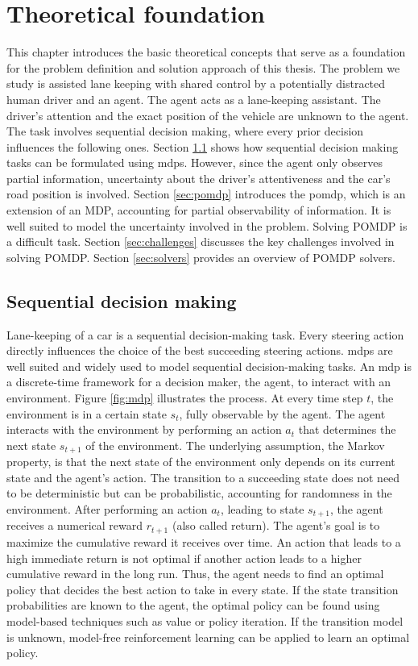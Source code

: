 \chapter{Theoretical foundation}
\label{ch:theory}

This chapter introduces the basic theoretical concepts that serve as a foundation for the problem definition and solution approach of this thesis. The problem we study is assisted lane keeping with shared control by a potentially distracted human driver and an agent. The agent acts as a lane-keeping assistant. The driver's attention and the exact position of the vehicle are unknown to the agent. The task involves sequential decision making, where every prior decision influences the following ones. Section \ref{sec:mdp} shows how sequential decision making tasks can be formulated using \Glspl{mdp}. However, since the agent only observes partial information, uncertainty about the driver's attentiveness and the car's road position is involved. Section \ref{sec:pomdp} introduces the \Gls{pomdp}, which is an extension of an MDP, accounting for partial observability of information. It is well suited to model the uncertainty involved in the problem. Solving POMDP is a difficult task. Section \ref{sec:challenges} discusses the key challenges involved in solving POMDP. Section \ref{sec:solvers} provides an overview of POMDP solvers.

\section{Sequential decision making}
\label{sec:mdp}

Lane-keeping of a car is a sequential decision-making task. Every steering action directly influences the choice of the best succeeding steering actions. \Glspl{mdp} are well suited and widely used to model sequential decision-making tasks. An \gls{mdp} is a discrete-time framework for a decision maker, the agent, to interact with an environment. Figure \ref{fig:mdp} illustrates the process. At every time step $t$, the environment is in a certain state $s_t$, fully observable by the agent. The agent interacts with the environment by performing an action $a_t$ that determines the next state $s_{t+1}$ of the environment. The underlying assumption, the Markov property, is that the next state of the environment only depends on its current state and the agent's action. The transition to a succeeding state does not need to be deterministic but can be probabilistic, accounting for randomness in the environment. After performing an action $a_t$, leading to state $s_{t+1}$, the agent receives a numerical reward $r_{t+1}$ (also called return). The agent's goal is to maximize the cumulative reward it receives over time. An action that leads to a high immediate return is not optimal if another action leads to a higher cumulative reward in the long run. Thus, the agent needs to find an optimal policy that decides the best action to take in every state. If the state transition probabilities are known to the agent, the optimal policy can be found using model-based techniques such as value or policy iteration. If the transition model is unknown, model-free reinforcement learning can be applied to learn an optimal policy.

